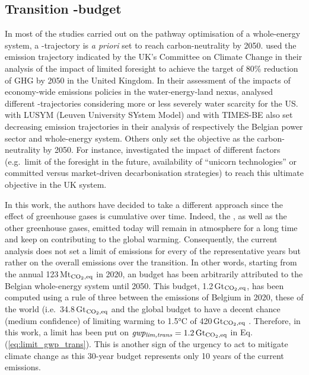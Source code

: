 \documentclass[11pt,twoside,a4paper,english]{article}
\def\eg{e.g.\ }
\def\ie{i.e.\ }
\begin{document}
\subsection{Transition -budget}
\label{subsec:cs:CO2-budget}
In most of the studies carried out on the pathway optimisation of a whole-energy system, a -trajectory is \textit{a priori} set to reach carbon-neutrality by 2050. \citet{nerini2017myopic} used the emission trajectory indicated by the UK's Committee on Climate Change in their analysis of the impact of limited foresight to achieve the target of 80\% reduction of \gls{GHG} by 2050 in the United Kingdom. In their assessment of the impacts of economy-wide emissions policies in the water-energy-land nexus, \citet{licandeo2023assessing} analysed different -trajectories considering more or less severely water scarcity for the US. \citet{poncelet2016myopic} with LUSYM (Leuven University SYstem Model) and \citet{PATHS2050} with TIMES-BE also set decreasing emission trajectories in their analysis of respectively the Belgian power sector and whole-energy system.  Others only set the objective as the carbon-neutrality by 2050. For instance, \citet{heuberger2018impact} investigated the impact of different factors (\eg limit of the foresight in the future, availability of ``unicorn technologies'' or committed versus market-driven decarbonisation strategies) to reach this ultimate objective in the UK system.

In this work, the authors have decided to take a different approach since the effect of greenhouse gases is cumulative over time. Indeed, the , as well as the other greenhouse gases, emitted today will remain in atmosphere for a long time and keep on contributing to the global warming. Consequently, the current analysis does not set a limit of emissions for every of the representative years but rather on the overall emissions over the transition. In other words, starting from the annual 123\,Mt$_{\ce{CO2},\text{eq}}$ in 2020, an budget has been arbitrarily attributed to the Belgian whole-energy system until 2050. This budget, 1.2\,Gt$_{\ce{CO2},\text{eq}}$, has been computed using a rule of three between the emissions of Belgium in 2020, these of the world (\ie 34.8\,Gt$_{\ce{CO2},\text{eq}}$ \cite{ourworldindata_CO2_world} and the global budget to have a decent chance (medium confidence) of limiting warming to 1.5°C of 420\,Gt$_{\ce{CO2},\text{eq}}$ \cite{IPCC_CO2_budget}. Therefore, in this work, a limit has been put on $\emph{gwp\textsubscript{lim,trans}}=1.2\,\text{Gt}_{\ce{CO2},\text{eq}}$ in
Eq.\,(\ref{eq:limit_gwp_trans}). This is another sign of the urgency to act to mitigate climate change as this 30-year budget represents only 10 years of the current emissions.
\end{document}
